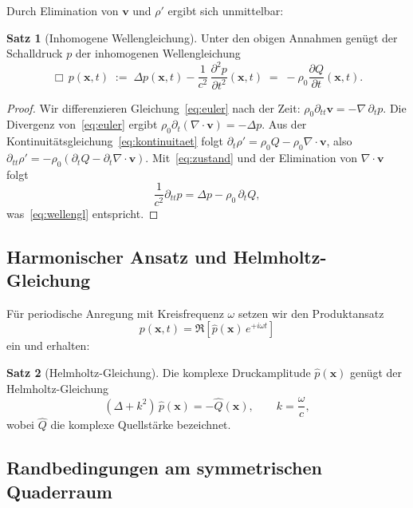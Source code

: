 ﻿\documentclass[12pt, a4paper]{article}
\theoremstyle{definition}
\newtheorem{satz}{Satz}[section]
\theoremstyle{remark}
\newcommand{\pfrac}[2]{\frac{\partial #1}{\partial #2}}
\begin{document}
Durch Elimination von $\mathbf{v}$ und $\rho'$ ergibt sich unmittelbar:

\begin{satz}[Inhomogene Wellengleichung]
\label{satz:welle}
Unter den obigen Annahmen genügt der Schalldruck $p$ der inhomogenen
Wellengleichung
\begin{equation}
  \Box\, p(\mathbf{x},t) \;:=\;
  \Delta p(\mathbf{x},t) - \frac{1}{c^2}\,\pfrac{^2 p}{t^2}(\mathbf{x},t)
  \;=\; -\rho_0 \pfrac{Q}{t}(\mathbf{x},t).
  \label{eq:wellengl}
\end{equation}
\end{satz}

\begin{proof}
Wir differenzieren Gleichung~\eqref{eq:euler} nach der Zeit:
$\rho_0 \partial_{tt} \mathbf{v} = -\nabla\,\partial_t p.$
Die Divergenz von~\eqref{eq:euler} ergibt
$\rho_0 \partial_t (\nabla \cdot \mathbf{v}) = -\Delta p.$
Aus der Kontinuitätsgleichung~\eqref{eq:kontinuitaet} folgt
$\partial_t \rho' = \rho_0 Q - \rho_0 \nabla\cdot\mathbf{v}$,
also $\partial_{tt}\rho' = -\rho_0(\partial_t Q - \partial_t\nabla\cdot\mathbf{v}).$
Mit~\eqref{eq:zustand} und der Elimination von $\nabla\cdot\mathbf{v}$ folgt
\[
  \frac{1}{c^2}\partial_{tt} p = \Delta p - \rho_0\, \partial_t Q,
\]
was~\eqref{eq:wellengl} entspricht. 
\end{proof}

\subsection{Harmonischer Ansatz und Helmholtz-Gleichung}

Für periodische Anregung mit Kreisfrequenz $\omega$ setzen wir den Produktansatz
\[
  p(\mathbf{x},t) = \Re\!\left[\hat{p}(\mathbf{x})\,e^{+i\omega t}\right]
\]
ein und erhalten:

\begin{satz}[Helmholtz-Gleichung]
Die komplexe Druckamplitude $\hat{p}(\mathbf{x})$ genügt der
Helmholtz-Gleichung
\begin{equation}
  (\Delta + k^2)\,\hat{p}(\mathbf{x}) = -\hat{Q}(\mathbf{x}),
  \qquad k = \frac{\omega}{c},
  \label{eq:helmholtz}
\end{equation}
wobei $\hat{Q}$ die komplexe Quellstärke bezeichnet.
\end{satz}

\subsection{Randbedingungen am symmetrischen Quaderraum}
\end{document}
